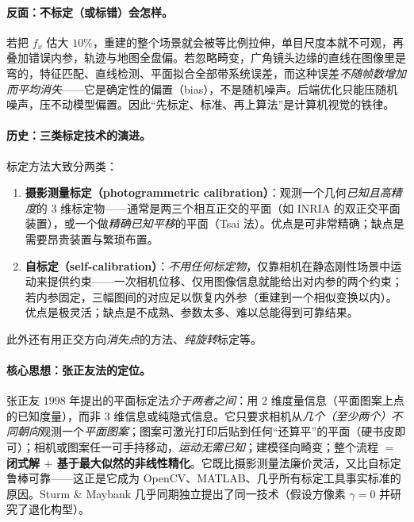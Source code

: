 \paragraph{反面：不标定（或标错）会怎样。}
若把 $f_x$ 估大 $10\%$，重建的整个场景就会被等比例拉伸，单目尺度本就不可观，再叠加错误内参，轨迹与地图全盘偏。若忽略畸变，广角镜头边缘的直线在图像里是弯的，特征匹配、直线检测、平面拟合全部带系统误差，而这种误差\emph{不随帧数增加而平均消失}——它是确定性的偏置（bias），不是随机噪声。后端优化只能压随机噪声，压不动模型偏置。因此“先标定、标准、再上算法”是计算机视觉的铁律。

\paragraph{历史：三类标定技术的演进。}
标定方法大致分两类\cite{zhang2000calibration}：

\begin{enumerate}
  \item \textbf{摄影测量标定（photogrammetric calibration）}：观测一个几何\emph{已知且高精度}的 $3$ 维标定物——通常是两三个相互正交的平面（如 INRIA 的双正交平面装置），或一个做\emph{精确已知平移}的平面（Tsai 法\cite{tsai1987versatile}）。优点是可非常精确；缺点是需要昂贵装置与繁琐布置。
  \item \textbf{自标定（self-calibration）}：\emph{不用任何标定物}，仅靠相机在静态刚性场景中运动来提供约束——一次相机位移、仅用图像信息就能给出对内参的两个约束\cite{luong1997selfcalib}；若内参固定，三幅图间的对应足以恢复内外参（重建到一个相似变换以内）。优点是极灵活；缺点是不成熟、参数太多、难以总能得到可靠结果。
\end{enumerate}
此外还有用正交方向\emph{消失点}的方法、\emph{纯旋转}标定等。

\paragraph{核心思想：张正友法的定位。}
张正友 $1998$ 年提出的平面标定法\cite{zhang2000calibration}\emph{介于两者之间}：用 $2$ 维度量信息（平面图案上点的已知度量），而非 $3$ 维信息或纯隐式信息。它只要求相机从\emph{几个（至少两个）不同朝向}观测一个\emph{平面图案}；图案可激光打印后贴到任何“还算平”的平面（硬书皮即可）；相机或图案任一可手持移动，\emph{运动无需已知}；建模径向畸变；整个流程 $=$ \textbf{闭式解 $+$ 基于最大似然的非线性精化}。它既比摄影测量法廉价灵活，又比自标定鲁棒可靠——这正是它成为 OpenCV、MATLAB、几乎所有标定工具事实标准的原因。Sturm \& Maybank\cite{sturm1999plane} 几乎同期独立提出了同一技术（假设方像素 $\gamma=0$ 并研究了退化构型）。

